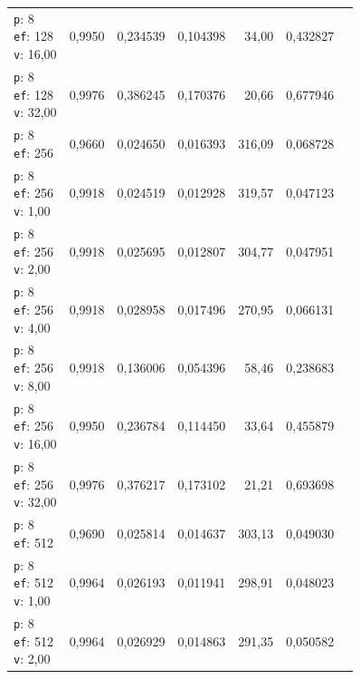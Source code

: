 \begin{table}[htbp]
\begin{tabularx}{\textwidth}{Xrrrrrr}
    \makecell{\texttt{p}: 8\\\texttt{ef}: 128\\\texttt{v}: 16,00} & 0,9950 & 0,234539 & 0,104398 & 34,00 & 0,432827 \\
    \makecell{\texttt{p}: 8\\\texttt{ef}: 128\\\texttt{v}: 32,00} & 0,9976 & 0,386245 & 0,170376 & 20,66 & 0,677946 \\
    \makecell{\texttt{p}: 8\\\texttt{ef}: 256} & 0,9660 & 0,024650 & 0,016393 & 316,09 & 0,068728 \\
    \makecell{\texttt{p}: 8\\\texttt{ef}: 256\\\texttt{v}: 1,00} & 0,9918 & 0,024519 & 0,012928 & 319,57 & 0,047123 \\
    \makecell{\texttt{p}: 8\\\texttt{ef}: 256\\\texttt{v}: 2,00} & 0,9918 & 0,025695 & 0,012807 & 304,77 & 0,047951 \\
    \makecell{\texttt{p}: 8\\\texttt{ef}: 256\\\texttt{v}: 4,00} & 0,9918 & 0,028958 & 0,017496 & 270,95 & 0,066131 \\
    \makecell{\texttt{p}: 8\\\texttt{ef}: 256\\\texttt{v}: 8,00} & 0,9918 & 0,136006 & 0,054396 & 58,46 & 0,238683 \\
    \makecell{\texttt{p}: 8\\\texttt{ef}: 256\\\texttt{v}: 16,00} & 0,9950 & 0,236784 & 0,114450 & 33,64 & 0,455879 \\
    \makecell{\texttt{p}: 8\\\texttt{ef}: 256\\\texttt{v}: 32,00} & 0,9976 & 0,376217 & 0,173102 & 21,21 & 0,693698 \\
    \makecell{\texttt{p}: 8\\\texttt{ef}: 512} & 0,9690 & 0,025814 & 0,014637 & 303,13 & 0,049030 \\
    \makecell{\texttt{p}: 8\\\texttt{ef}: 512\\\texttt{v}: 1,00} & 0,9964 & 0,026193 & 0,011941 & 298,91 & 0,048023 \\
    \makecell{\texttt{p}: 8\\\texttt{ef}: 512\\\texttt{v}: 2,00} & 0,9964 & 0,026929 & 0,014863 & 291,35 & 0,050582 \\

\end{tabularx}
\end{table}
